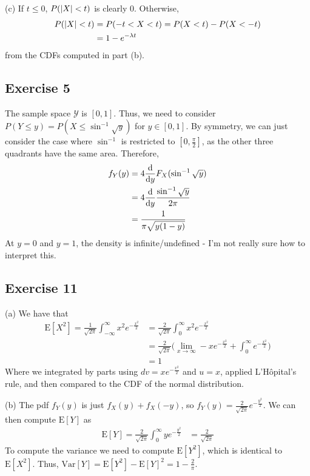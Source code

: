 (c) If $t \leq 0$, $P(\abs{X} < t)$ is clearly 0. Otherwise,
\begin{align*}
        P(\abs{X} < t) &= P(-t < X < t) = P(X < t) - P(X < -t) \\
                       &= 1 - e^{- \lambda t} 
\end{align*}
from the CDFs computed in part (b). 

\subsection{Exercise 5}
The sample space $\mathcal{Y}$ is $[0, 1]$. Thus, we need to consider 
$P(Y \leq y) = P(X \leq \sin^{-1} \sqrt{y})$ for $y \in [0, 1]$. By symmetry, we can just consider the case
where $\sin^{-1}$ is restricted to $[0, \frac{\pi}{2}]$, as the other three quadrants have the same area.
Therefore,
\begin{align*}
        f_Y(y) &= 4 \dv{y} F_X(\sin^{-1} \sqrt{y}) \\
               &= 4 \dv{y} \frac{\sin^{-1} \sqrt{y}}{2\pi} \\
               &= \frac{1}{\pi \sqrt{y (1 - y)}}
\end{align*}
At $y = 0$ and $y = 1$, the density is infinite/undefined - I'm not really sure how to interpret this.

\subsection{Exercise 11}
(a) We have that 
\begin{align*}
        \mathrm{E} [X^2] = \frac{1}{\sqrt{2\pi}}\int_{-\infty}^{\infty} x^2 e^{-\frac{x^2}{2}} &= \frac{2}{\sqrt{2\pi}} \int_{0}^{\infty} x^2 e^{-\frac{x^2}{2}} \\
                                                                            &= \frac{2}{\sqrt{2\pi}} \big(\lim_{x \to \infty} -x e^{-\frac{x^2}{2}} + \int_{0}^{\infty} e^{-\frac{x^2}{2}}\big) \\
                                                                            &= 1
\end{align*}
Where we integrated by parts using $dv = xe^{-\frac{x^2}{2}}$ and $u = x$, applied L'H\^opital's rule, 
and then compared to the CDF of the normal distribution.

(b) The pdf $f_Y(y)$ is just $f_X(y) + f_X(-y)$, so $f_Y(y) = \frac{2}{\sqrt{2\pi}} e^{-\frac{y^2}{2}}$.
We can then compute $\mathrm{E} [Y]$ as
\begin{align*}
        \mathrm{E} [Y] = \frac{2}{\sqrt{2\pi}} \int_{0}^{\infty} y e^{-\frac{y^2}{2}} &= \frac{2}{\sqrt{2\pi}}  
\end{align*}
To compute the variance we need to compute $\mathrm{E} [Y^2]$, which is identical to $\mathrm{E} [X^2]$. Thus, 
$\mathrm{Var} [Y] = \mathrm{E} [Y^2] - \mathrm{E} [Y]^2 = 1 - \frac{2}{\pi}$.

